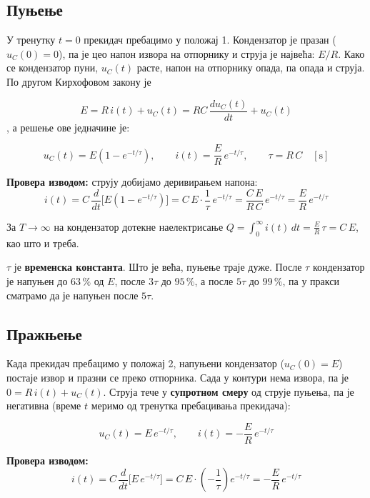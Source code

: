 \documentclass{article}
\begin{document}
\subsection{Пуњење}

У тренутку $t = 0$ прекидач пребацимо у положај 1. Кондензатор је празан
($u_C(0) = 0$), па је цео напон извора на отпорнику и струја је највећа: $E/R$.
Како се кондензатор пуни, $u_C(t)$ расте, напон на отпорнику опада, па опада и
струја. По другом Кирхофовом закону је

\begin{equation}
  E = R\,i(t) + u_C(t) = RC\,\frac{d u_C(t)}{dt} + u_C(t)  
\end{equation}
, а решење ове
једначине је:
\begin{kljucno}
\[
u_C(t) = E\left(1 - e^{-t/\tau}\right), \qquad
i(t) = \frac{E}{R}\,e^{-t/\tau}, \qquad
\tau = R\,C \quad [\text{s}]
\]
\end{kljucno}

\textbf{Провера изводом:} струју добијамо деривирањем напона:
\[
i(t) = C\,\frac{d}{dt}\Big[E\left(1 - e^{-t/\tau}\right)\Big]
     = C\,E\cdot\frac{1}{\tau}\,e^{-t/\tau}
     = \frac{C\,E}{R\,C}\,e^{-t/\tau}
     = \frac{E}{R}\,e^{-t/\tau}
\]

За $T \to \infty$ на кондензатор дотекне наелектрисање
$Q = \int_0^\infty i(t)\,dt = \frac{E}{R}\,\tau = C\,E$, као што и треба.

$\tau$ је \textbf{временска константа}. Што је већа, пуњење траје дуже. После
$\tau$ кондензатор је напуњен до $63\,\%$ од $E$, после $3\tau$ до $95\,\%$, а
после $5\tau$ до $99\,\%$, па у пракси сматрамо да је напуњен после $5\tau$.

\subsection{Пражњење}

Када прекидач пребацимо у положај 2, напуњени кондензатор ($u_C(0) = E$)
постаје извор и празни се преко отпорника. Сада у контури нема извора, па је
$0 = R\,i(t) + u_C(t)$. Струја тече у \textbf{супротном смеру} од струје
пуњења, па је негативна (време $t$ меримо од тренутка пребацивања прекидача):
\begin{kljucno}
\[
u_C(t) = E\,e^{-t/\tau}, \qquad i(t) = -\frac{E}{R}\,e^{-t/\tau}
\]
\end{kljucno}

\textbf{Провера изводом:}
\[
i(t) = C\,\frac{d}{dt}\Big[E\,e^{-t/\tau}\Big]
     = C\,E\cdot\left(-\frac{1}{\tau}\right) e^{-t/\tau}
     = -\frac{E}{R}\,e^{-t/\tau}
\]
\end{document}
